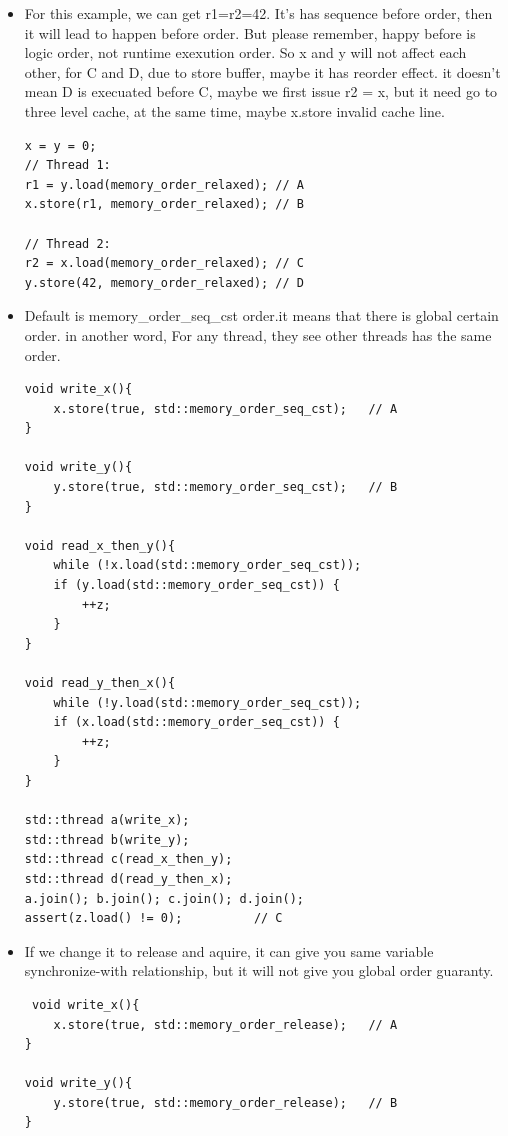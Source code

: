 \documentclass[a4paper,11pt,twoside]{book}
\begin{document}
\begin{itemize}
		\item For this example, we can get r1=r2=42. It's has sequence before order, then it will lead to happen before order. But please remember, happy before is logic order, not runtime exexution order. So x and y will not affect each other, for C and D, due to store buffer, maybe it has reorder effect. it doesn't mean D is execuated before C, maybe we first issue r2 = x, but it need go to three level cache, at the same time, maybe x.store invalid cache line. 

\begin{lstlisting}
x = y = 0;
// Thread 1:
r1 = y.load(memory_order_relaxed); // A
x.store(r1, memory_order_relaxed); // B

// Thread 2:
r2 = x.load(memory_order_relaxed); // C
y.store(42, memory_order_relaxed); // D
\end{lstlisting}


\item Default is memory\_order\_seq\_cst order.it means that there is global certain order. in another word, For any thread, they see other threads has the same order.  


\begin{lstlisting}
void write_x(){
    x.store(true, std::memory_order_seq_cst);	// A
}
 
void write_y(){
    y.store(true, std::memory_order_seq_cst);	// B
}
 
void read_x_then_y(){
    while (!x.load(std::memory_order_seq_cst));
    if (y.load(std::memory_order_seq_cst)) {
        ++z;
    }
}
 
void read_y_then_x(){
    while (!y.load(std::memory_order_seq_cst));
    if (x.load(std::memory_order_seq_cst)) {
        ++z;
    }
}
 
std::thread a(write_x);
std::thread b(write_y);
std::thread c(read_x_then_y);
std::thread d(read_y_then_x);
a.join(); b.join(); c.join(); d.join();
assert(z.load() != 0);			// C
\end{lstlisting}

\item If we change it to release and aquire, it can give you same variable synchronize-with relationship, but it will not give you global order guaranty.  

\begin{lstlisting}
 void write_x(){
    x.store(true, std::memory_order_release);	// A
}
 
void write_y(){
    y.store(true, std::memory_order_release);	// B
}
 

\end{lstlisting}
\end{itemize}
\end{document}
